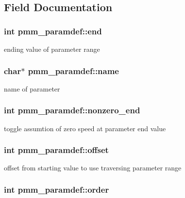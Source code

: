 \subsection{Field Documentation}
\hypertarget{structpmm__paramdef_aeefe385ef1f9223ce7b9917ffe846737}{
\subsubsection[{end}]{\setlength{\rightskip}{0pt plus 5cm}int pmm\-\_\-paramdef\-::end}}\label{structpmm__paramdef_aeefe385ef1f9223ce7b9917ffe846737}
ending value of parameter range \hypertarget{structpmm__paramdef_a2fd54ad669ea6676bc54e3a8c0ccc063}{
\subsubsection[{name}]{\setlength{\rightskip}{0pt plus 5cm}char$\ast$ pmm\-\_\-paramdef\-::name}}\label{structpmm__paramdef_a2fd54ad669ea6676bc54e3a8c0ccc063}
name of parameter \hypertarget{structpmm__paramdef_ac48fd1f2b85c4c705bff24e1455be42b}{
\subsubsection[{nonzero\-\_\-end}]{\setlength{\rightskip}{0pt plus 5cm}int pmm\-\_\-paramdef\-::nonzero\-\_\-end}}\label{structpmm__paramdef_ac48fd1f2b85c4c705bff24e1455be42b}
toggle assumtion of zero speed at parameter end value \hypertarget{structpmm__paramdef_aa41fd62c9db57508f30397eaedfe5a86}{
\subsubsection[{offset}]{\setlength{\rightskip}{0pt plus 5cm}int pmm\-\_\-paramdef\-::offset}}\label{structpmm__paramdef_aa41fd62c9db57508f30397eaedfe5a86}
offset from starting value to use traversing parameter range \hypertarget{structpmm__paramdef_a37daef9b55c74e8bf65821d5b8f31afa}{
\subsubsection[{order}]{\setlength{\rightskip}{0pt plus 5cm}int pmm\-\_\-paramdef\-::order}}\label{structpmm__paramdef_a37daef9b55c74e8bf65821d5b8f31afa}
